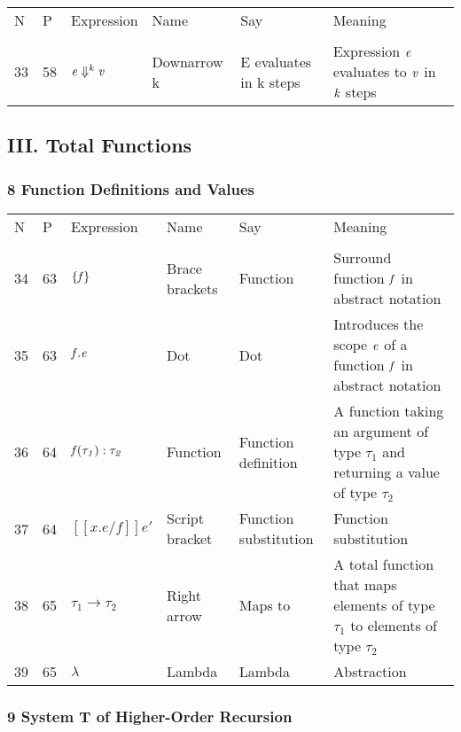\documentclass[12pt]{article}
\begin{document}
\begin{tabular}[b] {p{} p{} p{} p{} 
p{} p{}}
N & P & Expression & Name & Say & Meaning \\ \\

33& 58 & $\it{e} \Downarrow ^{\it{k}}\it{v}$  & Downarrow k & E evaluates in k steps & Expression $ \it{e}$ evaluates to $\it{v}$ in $\it{k}$ steps\\
\end{tabular}

\subsection*{III. Total Functions}
\subsubsection*{8 Function Definitions and Values}

\begin{tabular}[b] {p{} p{} p{} p{} 
p{} p{}}
N & P & Expression & Name & Say & Meaning \\ \\

34& 63 & $\{\it{f}\}$ & Brace brackets & Function & Surround function $\it{f}$ in abstract notation \\

35& 63 & $\it{f}.\it{e}$ & Dot & Dot & Introduces the scope $\it{e}$ of a function $\it{f}$ in abstract notation \\
36& 64 & $\it{f}(\tau_1):\tau_2$ & Function & Function definition & A function taking an argument of type $\tau_1$ and returning a value of type $\tau_2$ \\

37& 64 &  $[\![x.e/f]\!]e'$ & Script bracket & Function substitution & Function substitution \\

38& 65 & $\tau_1 \to \tau_2$ & Right arrow & Maps to & A total function that maps elements of type $\tau_1$ to elements of type $\tau_2$ \\
39& 65 & $\lambda $ & Lambda & Lambda & Abstraction \\
\end{tabular}
\subsubsection*{9 System T of Higher-Order Recursion}
\end{document}
